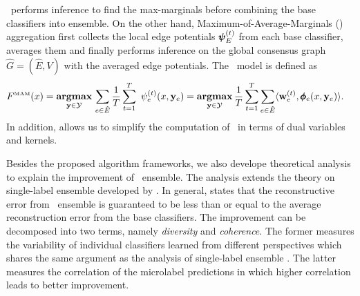 {%
\amm\ performs inference to find the max-marginals before combining the base classifiers into ensemble. 
On the other hand, Maximum-of-Average-Marginals (\mam) aggregation first collects the local edge potentials $\pmb \psi_E^{(t)}$ from each base classifier, averages them and finally performs inference on the global consensus graph $\hat{G}=(\hat{E},V)$ with the averaged edge potentials.
The \mam\ model is defined as
\begin{align*}
	F^{\text{\tiny MAM}}(x) &= \underset{\vy \in \Ycal }{\argmax}\,\sum_{e\in \hat{E}}\frac{1}{T}\sum_{t=1}^{T}\ \psi^{(t)}_e(x,\vy_e)
	= \underset{\vy \in \Ycal}{\argmax}\, \frac{1}{T} \sum_{t=1}^T \sum_{e\in \hat{E}} \ip{\vw_e^{(t)}}{\phib_e(x,\vy_e)}. %
\end{align*}
In addition,  allows us to simplify the computation of \mam\ in terms of dual variables and kernels.

Besides the proposed algorithm frameworks, we also develope theoretical analysis to explain the improvement of \mam\ ensemble.
The analysis extends the theory on single-label ensemble developed by \citet{Brown10good}.
In general,  states that the reconstructive error from \mam\ ensemble is guaranteed to be less than or equal to the average reconstruction error from the base classifiers.
The improvement can be decomposed into two terms, namely \textit{diversity} and \textit{coherence}.
The former measures the variability of individual classifiers learned from different perspectives which shares the same argument as the analysis of single-label ensemble \citep{Brown10good}.
The latter measures the correlation of the microlabel predictions in which higher correlation leads to better improvement.



}
